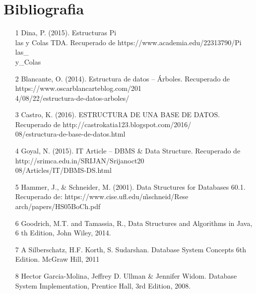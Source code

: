 \documentclass[twoside,twocolumn]{article}
\begin{document}

\section{Bibliografia}\label{sec:7}
\begin{itemize}
\item [1] Dina, P. (2015). Estructuras Pi\\las y Colas TDA. Recuperado de https://www.academia.edu/22313790/Pi\\las\_\\y\_Colas \\
\item [2] Blancante, O. (2014). Estructura de datos – Árboles. Recuperado de https://www.oscarblancarteblog.com/201\\4/08/22/estructura-de-datos-arboles/\\
\item [3] Castro, K. (2016). ESTRUCTURA DE UNA BASE DE DATOS. Recuperado de http://castrokatia123.blogspot.com/2016/\\08/estructura-de-base-de-datos.html\\
\item [4] Goyal, N. (2015). IT Article -- DBMS \& Data Structure. Recuperado de http://srimca.edu.in/SRIJAN/Srijanoct20\\08/Articles/IT/DBMS-DS.html\\
\item [5] Hammer, J., \& Schneider, M. (2001). Data Structures for Databases 60.1. Recuperado de: https://www.cise.ufl.edu/\~mschneid/Rese\\arch/papers/HS05BoCh.pdf\\
\item [6] Goodrich, M.T. and Tamassia, R., Data Structures and Algorithms in Java, 6 th Edition, John Wiley, 2014.\\
\item [7] A Silberschatz, H.F. Korth, S. Sudarshan. Database System Concepts 6th Edition. McGraw Hill, 2011\\
\item [8] Hector Garcia-Molina, Jeffrey D. Ullman \& Jennifer Widom. Database System Implementation, Prentice Hall, 3rd Edition, 2008.\\
\end{itemize}


\end{document}
